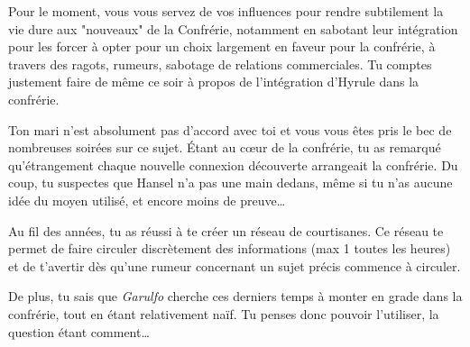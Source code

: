 {	\par Pour le moment, vous vous servez de vos influences pour rendre subtilement la vie dure aux "nouveaux" de la Confrérie, notamment en sabotant leur intégration pour les forcer à opter pour un choix largement en faveur pour la confrérie, à travers des ragots, rumeurs, sabotage de relations commerciales. Tu comptes justement faire de même ce soir à propos de l'intégration d'Hyrule dans la confrérie.
	
	\par Ton mari n'est absolument pas d'accord avec toi et vous vous êtes pris le bec de nombreuses soirées sur ce sujet. Étant au cœur de la confrérie, tu as remarqué qu'étrangement chaque nouvelle connexion découverte arrangeait la confrérie. Du coup, tu suspectes que Hansel n'a pas une main dedans, même si tu n'as aucune idée du moyen utilisé, et encore moins de preuve\dots
	
	\par Au fil des années, tu as réussi à te créer un réseau de courtisanes. Ce réseau te permet de faire circuler discrètement des informations (max 1 toutes les heures) et de t'avertir dès qu'une rumeur concernant un sujet précis commence à circuler.
	
	\par De plus, tu sais que \emph{Garulfo} cherche ces derniers temps à monter en grade dans la confrérie, tout en étant relativement naïf. Tu penses donc pouvoir l'utiliser, la question étant comment\dots
}



